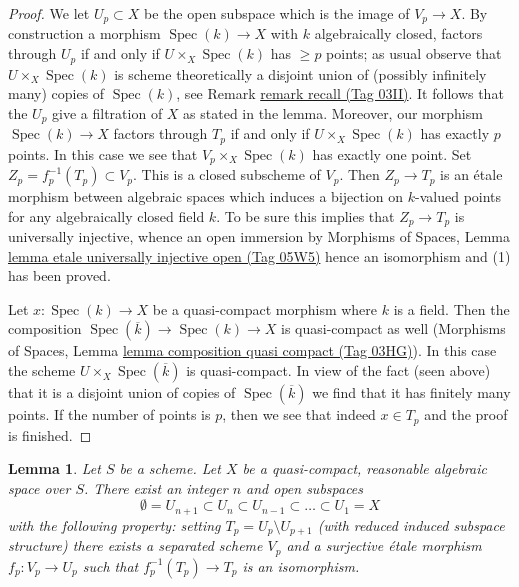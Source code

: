 \documentclass{amsart}
\theoremstyle{plain}
\newtheorem{lemma}[subsection]{Lemma}
\theoremstyle{definition}
\theoremstyle{remark}
\numberwithin{equation}{subsection}
\def\Spec{\mathop{\mathrm{Spec}}}
\begin{document}
\begin{proof}
\medskip\noindent
We let $U_p \subset X$ be the open subspace which is the
image of $V_p \to X$. By construction a morphism $\Spec(k) \to X$ with
$k$ algebraically closed, factors through $U_p$ if and only if
$U \times_X \Spec(k)$ has $\geq p$ points; as usual observe that
$U \times_X \Spec(k)$ is scheme theoretically a disjoint union of
(possibly infinitely many) copies of $\Spec(k)$, see
Remark \href{https://stacks.math.columbia.edu/tag/03II}{remark recall (Tag 03II)}. It follows that
the $U_p$ give a filtration of $X$ as stated in the lemma.
Moreover, our morphism $\Spec(k) \to X$ factors through $T_p$
if and only if $U \times_X \Spec(k)$ has exactly $p$ points.
In this case we see that $V_p \times_X \Spec(k)$ has exactly one point.
Set $Z_p = f_p^{-1}(T_p) \subset V_p$. This is a closed subscheme of $V_p$.
Then $Z_p \to T_p$ is an \'etale morphism between
algebraic spaces which induces a bijection on $k$-valued
points for any algebraically closed field $k$. To be sure this
implies that $Z_p \to T_p$ is universally injective, whence an
open immersion by
Morphisms of Spaces, Lemma
\href{https://stacks.math.columbia.edu/tag/05W5}{lemma etale universally injective open (Tag 05W5)}
hence an isomorphism and (1) has been proved.

\medskip\noindent
Let $x : \Spec(k) \to X$ be a quasi-compact morphism where $k$ is a field.
Then the composition $\Spec(\overline{k}) \to \Spec(k) \to X$ is quasi-compact
as well (Morphisms of Spaces, Lemma
\href{https://stacks.math.columbia.edu/tag/03HG}{lemma composition quasi compact (Tag 03HG)}).
In this case the scheme $U \times_X \Spec(\overline{k})$ is
quasi-compact. In view of the fact (seen above) that it is a disjoint union
of copies of $\Spec(\overline{k})$ we find that it has finitely many points.
If the number of points is $p$, then we see that indeed $x \in T_p$ and
the proof is finished.
\end{proof}


\begin{lemma}
\label{decent-spaces-lemma-filter-reasonable}
Let $S$ be a scheme. Let $X$ be a quasi-compact, reasonable algebraic space
over $S$. There exist an integer $n$ and open subspaces
$$
\emptyset = U_{n + 1} \subset
U_n \subset U_{n - 1} \subset \ldots \subset U_1 = X
$$
with the following property: setting $T_p = U_p \setminus U_{p + 1}$
(with reduced induced subspace structure) there exists a separated scheme
$V_p$ and a surjective \'etale morphism $f_p : V_p \to U_p$ such that
$f_p^{-1}(T_p) \to T_p$ is an isomorphism.
\end{lemma}
\end{document}
